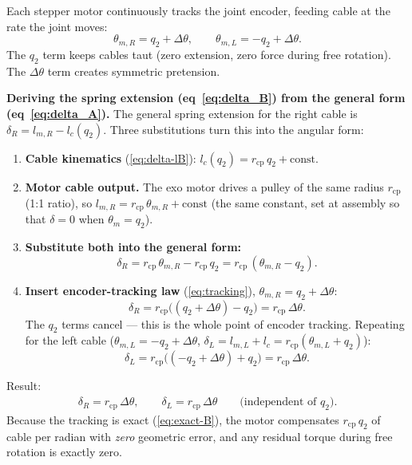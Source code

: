 \documentclass[11pt, a4paper]{article}
\begin{document}
Each stepper motor continuously tracks the joint encoder, feeding cable at
the rate the joint moves:
%
\begin{equation}\label{eq:tracking}
    \theta_{m,R} = q_2 + \Delta\theta, \qquad
    \theta_{m,L} = -q_2 + \Delta\theta.
\end{equation}
%
The $q_2$ term keeps cables taut (zero extension, zero force during free
rotation).  The $\Delta\theta$ term creates symmetric pretension.

\medskip\noindent
\textbf{Deriving the spring extension (eq~\ref{eq:delta_B}) from the general
form (eq~\ref{eq:delta_A}).}\;
The general spring extension for the right cable is
$\delta_R = l_{m,R} - l_c(q_2)$.  Three substitutions turn this into
the angular form:

\begin{enumerate}
\item \textbf{Cable kinematics} (\cref{eq:delta-lB}):\;
      $l_c(q_2) = r_{\text{cp}}\,q_2 + \text{const}$.

\item \textbf{Motor cable output.}\;
      The exo motor drives a pulley of the same radius $r_{\text{cp}}$
      (1:1 ratio), so
      $l_{m,R} = r_{\text{cp}}\,\theta_{m,R} + \text{const}$
      (the same constant, set at assembly so that $\delta = 0$ when
      $\theta_m = q_2$).

\item \textbf{Substitute both into the general form:}
      \[
          \delta_R
          = r_{\text{cp}}\,\theta_{m,R} - r_{\text{cp}}\,q_2
          = r_{\text{cp}}\,(\theta_{m,R} - q_2).
      \]

\item \textbf{Insert encoder-tracking law} (\cref{eq:tracking}),
      $\theta_{m,R} = q_2 + \Delta\theta$:
      \[
          \delta_R
          = r_{\text{cp}}\bigl((q_2 + \Delta\theta) - q_2\bigr)
          = r_{\text{cp}}\,\Delta\theta.
      \]
      The $q_2$ terms cancel --- this is the whole point of encoder
      tracking.  Repeating for the left cable
      ($\theta_{m,L} = -q_2 + \Delta\theta$,
       $\delta_L = l_{m,L} + l_c = r_{\text{cp}}(\theta_{m,L} + q_2)$):
      \[
          \delta_L
          = r_{\text{cp}}\bigl((-q_2 + \Delta\theta) + q_2\bigr)
          = r_{\text{cp}}\,\Delta\theta.
      \]
\end{enumerate}

\noindent
Result:
%
\begin{align}\label{eq:delta_B}
    \delta_R = r_{\text{cp}}\,\Delta\theta, \qquad
    \delta_L = r_{\text{cp}}\,\Delta\theta
    \qquad\text{(independent of $q_2$)}.
\end{align}
%
Because the tracking is exact (\cref{eq:exact-B}), the motor compensates
$r_{\text{cp}}\,q_2$ of cable per radian with \emph{zero} geometric error,
and any residual torque during free rotation is exactly zero.
\end{document}
